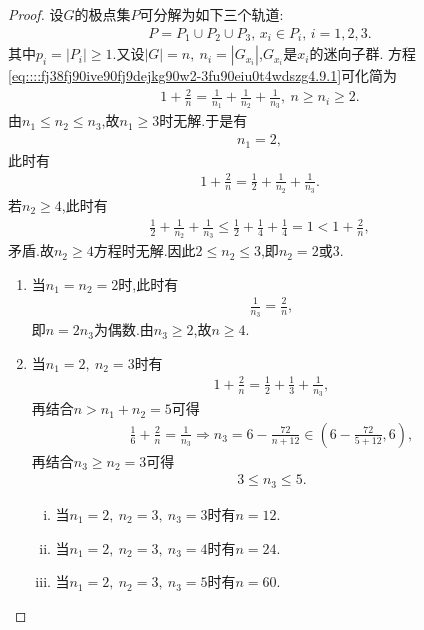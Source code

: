 \documentclass[../../main.tex]{subfiles}%
\begin{document}
\begin{proof}

设$G$的极点集$P$可分解为如下三个轨道:
\begin{align*}
P=P_1\cup P_2\cup P_3,\,x_i\in P_i,\,i=1,2,3.
\end{align*}
其中$p_i=|P_i|\geqslant1.$又设$|G|=n,\ n_i=|G_{x_i}|$,$G_{x_i}$是$x_i$的迷向子群.
方程\eqref{eq::::fj38fj90ive90fj9dejkg90w2-3fu90eiu0t4wdszg4.9.1}可化简为
\begin{align*}
1+\frac{2}{n}=\frac{1}{n_1}+\frac{1}{n_2}+\frac{1}{n_3},\ n\geqslant n_i\geqslant 2.
\end{align*}
由$n_1\leqslant n_2\leqslant n_3$,故$n_1\geqslant 3$时无解.于是有
\begin{align*}
n_1=2,
\end{align*}
此时有
\begin{align*}
1+\frac{2}{n}=\frac{1}{2}+\frac{1}{n_2}+\frac{1}{n_3}.
\end{align*}
若$n_2\geqslant 4$,此时有
\begin{align*}
\frac{1}{2}+\frac{1}{n_2}+\frac{1}{n_3}\leqslant\frac{1}{2}+\frac{1}{4}+\frac{1}{4}=1<1+\frac{2}{n},
\end{align*}
矛盾.故$n_2\geqslant 4$方程时无解.因此$2\leqslant n_2\leqslant3$,即$n_2=2\text{或}3$.
\begin{enumerate}[(1)]
\item 当$n_1=n_2=2$时,此时有
\begin{align*}
\frac{1}{n_3}=\frac{2}{n},
\end{align*}
即$n=2n_3$为偶数.由$n_3\geqslant 2$,故$n\geqslant 4$.

\item 当$n_1=2,\ n_2=3$时有
\begin{align*}
1+\frac{2}{n}=\frac{1}{2}+\frac{1}{3}+\frac{1}{n_3},
\end{align*}
再结合$n>n_1+n_2=5$可得
\begin{align*}
\frac{1}{6}+\frac{2}{n}=\frac{1}{n_3}\Longrightarrow n_3=6-\frac{72}{n+12}\in ( 6-\frac{72}{5+12},6),
\end{align*}
再结合$n_3\geqslant n_2=3$可得
\begin{align*}
3\leqslant n_3\leqslant 5.
\end{align*}
\begin{enumerate}[(i)]
\item 当$n_1=2,\ n_2=3,\ n_3=3$时有$n=12$.

\item 当$n_1=2,\ n_2=3,\ n_3=4$时有$n=24$.

\item 当$n_1=2,\ n_2=3,\ n_3=5$时有$n=60$.
\end{enumerate}
\end{enumerate}


\end{proof}
\end{document}
